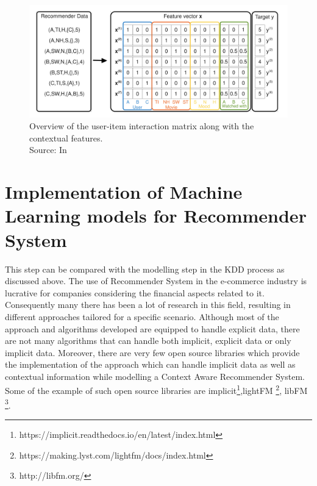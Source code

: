 \Par
\begin{figure}
    \centering
    \includegraphics[scale=0.4]{chapters/figures/FM.png}
    \caption{Overview of the user-item interaction matrix along with the contextual features. \\
    Source: In \textcite[5]{rendle2011fast}}
    \label{fig:FM}
\end{figure}

\section{Implementation of Machine Learning models for Recommender System}
This step can be compared with the modelling step in the KDD process as discussed above. The use of Recommender System in the e-commerce industry is lucrative for companies considering the financial aspects related to it. Consequently many there has been a lot of research in this field, resulting in different approaches tailored for a specific scenario. Although most of the approach and algorithms developed are equipped to handle explicit data, there are not many algorithms that can handle both implicit, explicit data or only implicit data. Moreover, there are very few open source libraries which provide the implementation of the approach which can handle implicit data as well as contextual information while modelling a Context Aware Recommender System. Some of the example of such open source libraries are implicit\footnote[1
]{https://implicit.readthedocs.io/en/latest/index.html},lightFM \footnote[2]{https://making.lyst.com/lightfm/docs/index.html}, libFM \footnote[3]{http://libfm.org/}. \\


